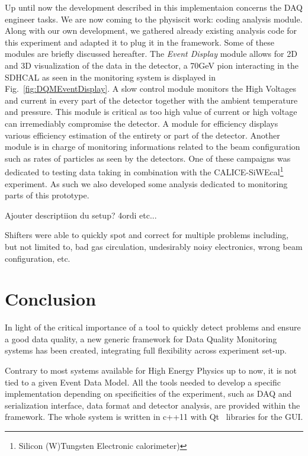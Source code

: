 \documentclass[conference]{IEEEtran}
\begin{document}
Up until now the development described in this implementaion concerns the DAQ engineer tasks. We are now coming to the physiscit work: coding analysis module. Along with our own development, we gathered already existing analysis code for this experiment and adapted it to plug it in the framework. Some of these modules are briefly discussed hereafter. The \textit{Event Display} module allows for 2D and 3D visualization of the data in the detector, a 70GeV pion interacting in the SDHCAL as seen in the monitoring system is displayed in Fig.~\ref{fig:DQMEventDisplay}. A slow control module monitors the High Voltages and current in every part of the detector together with the ambient temperature and pressure. This module is critical as too high value of current or high voltage can irremediably compromise the detector. A module for efficiency displays various efficiency estimation of the entirety or part of the detector. Another module is in charge of monitoring informations related to the beam configuration such as rates of particles as seen by the detectors. One of these campaigns was dedicated to testing data taking in combination with the CALICE-SiWEcal\footnote{Silicon (W)Tungsten Electronic calorimeter)} experiment. As such we also developed some analysis dedicated to monitoring parts of this prototype.

{\color{red} Ajouter descriptiion du setup? 4ordi etc...}


Shifters were able to quickly spot and correct for multiple problems including, but not limited to, bad gas circulation, undesirably noisy electronics, wrong beam configuration, etc.

\section{Conclusion}
In light of the critical importance of a tool to quickly detect problems and ensure a good data quality, a new generic framework for Data Quality Monitoring systems has been created, integrating full flexibility across experiment set-up.

Contrary to most systems available for High Energy Physics up to now, it is not tied to a given Event Data Model. All the tools needed to develop a specific implementation depending on specificities of the experiment, such as DAQ and serialization interface, data format and detector analysis, are provided within the framework.
The whole system is written in c++11 with Qt~\cite{QT} libraries for the GUI.
\end{document}
